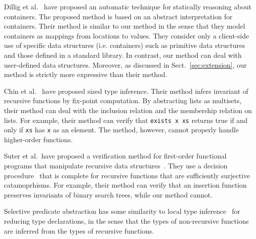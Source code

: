 Dillig et al.~\cite{Dillig2011} have proposed an automatic technique for
statically reasoning about containers.  The proposed method is based on
an abstract interpretation for containers.  Their method is similar to
our method in the sense that they model containers as mappings from
locations to values.  They consider only a client-side use of specific
data structures (i.e. containers) such as primitive data structures and
those defined in a standard library.  In contrast, our method can deal
with user-defined data structures.  Moreover, as discussed in
Sect.~\ref{sec:extension}, our method is strictly more expressive than
their method.

Chin et al.~\cite{Chin2003} have proposed sized type inference.  Their
method infers invariant of recursive functions by fix-point computation.
By abstracting lists as multisets, their method can deal with the
inclusion relation and the membership relation on lists.  For example, their method
can verify that \texttt{exists x xs} returns true if and only if
\texttt{xs} has \texttt{x} as an element.  The method, however, cannot
properly handle higher-order functions.

Suter et al.~have proposed a verification method for first-order
functional programs that manipulate recursive data
structures~\cite{Suter2011}.  They use a decision
procedure~\cite{Suter2010} that is complete for recursive functions that
are sufficiently surjective catamoprhisms.  For example, their method
can verify that an insertion function preserves invariants of binary
search trees, while our method cannot.

Selective predicate abstraction has some similarity to local type
inference~\cite{Pierce2000} for reducing type declarations, in the sense
that the types of non-recursive functions are inferred from the types of
recursive functions.
